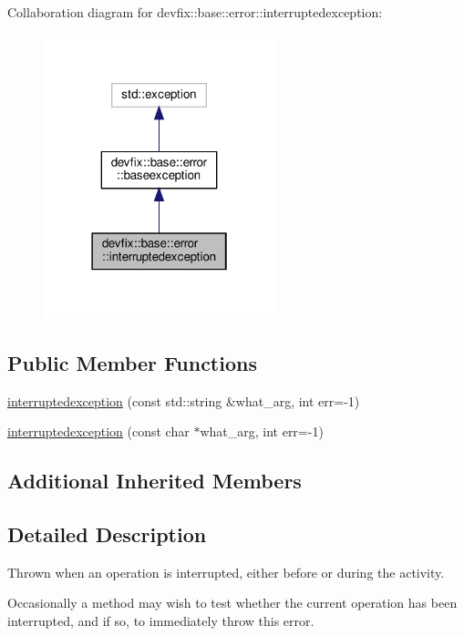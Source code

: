 Collaboration diagram for devfix\+:\+:base\+:\+:error\+:\+:interruptedexception\+:\nopagebreak
\begin{figure}[H]
\begin{center}
\leavevmode
\includegraphics[width=190pt]{structdevfix_1_1base_1_1error_1_1interruptedexception__coll__graph}
\end{center}
\end{figure}
\subsection*{Public Member Functions}
\begin{DoxyCompactItemize}
\item 
\hyperlink{structdevfix_1_1base_1_1error_1_1interruptedexception_a9b2d1244ef3e3029d231be8b84fa4c16}{interruptedexception} (const std\+::string \&what\+\_\+arg, int err=-\/1)
\item 
\hyperlink{structdevfix_1_1base_1_1error_1_1interruptedexception_a244a67233ab2b7be511706d8398ed860}{interruptedexception} (const char $\ast$what\+\_\+arg, int err=-\/1)
\end{DoxyCompactItemize}
\subsection*{Additional Inherited Members}


\subsection{Detailed Description}
Thrown when an operation is interrupted, either before or during the activity. 

Occasionally a method may wish to test whether the current operation has been interrupted, and if so, to immediately throw this error. 

